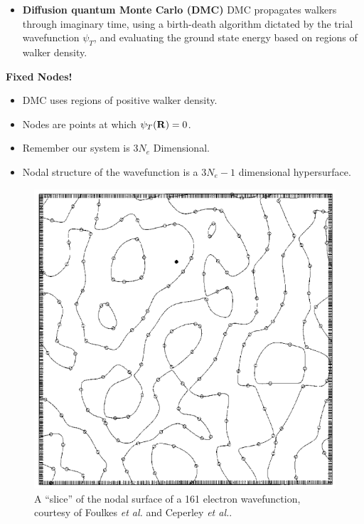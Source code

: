 \documentclass[10pt]{beamer}
\begin{document}
\begin{frame}[allowframebreaks]
    \begin{itemize}
        \item[\textbullet] \textbf{Diffusion quantum Monte Carlo (DMC)}\newline
        DMC propagates walkers through imaginary time, using a birth-death algorithm dictated by the trial wavefunction $\psi_T$, and evaluating the ground state energy based on regions of walker density.
    \end{itemize}
    \framebreak%

    \textbf{Fixed Nodes!}
    \begin{itemize}
        \item[\textbullet] DMC uses regions of positive walker density.
        \item[\textbullet] Nodes are points at which $\psi_T\pqty{\vb{R}}=0$.
        \item[\textbullet] Remember our system is $3N_e$ Dimensional.
        \item[\textbullet] Nodal structure of the wavefunction is a $3N_e-1$
        dimensional hypersurface.
    \end{itemize}
    \framebreak%

    \begin{figure}
        \includegraphics[scale=0.22]{./images/nodal-surface-slice.png}
        \caption{%
            A ``slice'' of the nodal surface of a 161 electron wavefunction,
            courtesy of Foulkes \textit{et al.}\cite{Foulkes2001} and Ceperley \textit{et al.}.
        }
    \end{figure}
    \framebreak%


\end{frame}
\end{document}

